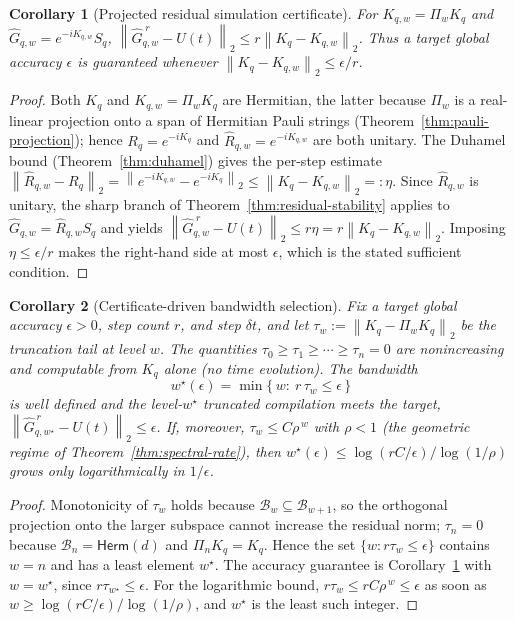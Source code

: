 \documentclass[aps,prresearch,reprint,superscriptaddress,nofootinbib,amsmath,amssymb]{revtex4-2}
\newcommand{\norm}[1]{\left\lVert #1 \right\rVert}
\newcommand{\cB}{\mathcal{B}}
\newcommand{\dt}{\delta t}
\newtheorem{corollary}{Corollary}
\begin{document}
\begin{corollary}[Projected residual simulation certificate]
\label{cor:projected-certificate}
For $K_{q,w}=\Pi_wK_q$ and $\widehat G_{q,w}=e^{-iK_{q,w}}S_q$, $\norm{\widehat G_{q,w}^{\;r}-U(t)}_2\leq r\norm{K_q-K_{q,w}}_2$. Thus a target global accuracy $\epsilon$ is guaranteed whenever $\norm{K_q-K_{q,w}}_2\leq\epsilon/r$.
\end{corollary}

\begin{proof}
Both $K_q$ and $K_{q,w}=\Pi_wK_q$ are Hermitian, the latter because $\Pi_w$ is a real-linear projection onto a span of Hermitian Pauli strings (Theorem~\ref{thm:pauli-projection}); hence $R_q=e^{-iK_q}$ and $\widehat R_{q,w}=e^{-iK_{q,w}}$ are both unitary. The Duhamel bound (Theorem~\ref{thm:duhamel}) gives the per-step estimate $\norm{\widehat R_{q,w}-R_q}_2=\norm{e^{-iK_{q,w}}-e^{-iK_q}}_2\leq\norm{K_q-K_{q,w}}_2=:\eta$. Since $\widehat R_{q,w}$ is unitary, the sharp branch of Theorem~\ref{thm:residual-stability} applies to $\widehat G_{q,w}=\widehat R_{q,w}S_q$ and yields $\norm{\widehat G_{q,w}^{\;r}-U(t)}_2\leq r\eta=r\norm{K_q-K_{q,w}}_2$. Imposing $\eta\leq\epsilon/r$ makes the right-hand side at most $\epsilon$, which is the stated sufficient condition.
\end{proof}

\begin{corollary}[Certificate-driven bandwidth selection]
\label{cor:bandwidth}
Fix a target global accuracy $\epsilon>0$, step count $r$, and step $\dt$, and let $\tau_w:=\norm{K_q-\Pi_wK_q}_2$ be the truncation tail at level $w$. The quantities $\tau_0\geq\tau_1\geq\cdots\geq\tau_n=0$ are nonincreasing and computable from $K_q$ alone (no time evolution). The bandwidth
\begin{equation}
    w^\star(\epsilon)=\min\{\,w:\ r\,\tau_w\leq\epsilon\,\}
\end{equation}
is well defined and the level-$w^\star$ truncated compilation meets the target, $\norm{\widehat G_{q,w^\star}^{\,r}-U(t)}_2\leq\epsilon$. If, moreover, $\tau_w\leq C\rho^{\,w}$ with $\rho<1$ (the geometric regime of Theorem~\ref{thm:spectral-rate}), then $w^\star(\epsilon)\leq\log(rC/\epsilon)/\log(1/\rho)$ grows only logarithmically in $1/\epsilon$.
\end{corollary}

\begin{proof}
Monotonicity of $\tau_w$ holds because $\cB_w\subseteq\cB_{w+1}$, so the orthogonal projection onto the larger subspace cannot increase the residual norm; $\tau_n=0$ because $\cB_n=\mathsf{Herm}(d)$ and $\Pi_nK_q=K_q$. Hence the set $\{w:r\tau_w\leq\epsilon\}$ contains $w=n$ and has a least element $w^\star$. The accuracy guarantee is Corollary~\ref{cor:projected-certificate} with $w=w^\star$, since $r\tau_{w^\star}\leq\epsilon$. For the logarithmic bound, $r\tau_w\leq rC\rho^{\,w}\leq\epsilon$ as soon as $w\geq\log(rC/\epsilon)/\log(1/\rho)$, and $w^\star$ is the least such integer.
\end{proof}
\end{document}
